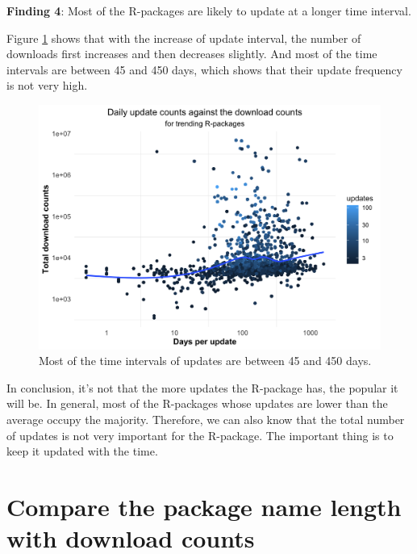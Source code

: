 \documentclass[
]{book}
\newenvironment{discovery}[1]{%
  \begin{tcolorbox}[colback=blue!30,colframe=blue!80!black]#1}{\end{tcolorbox}}
\begin{document}
\begin{discovery}
\textbf{Finding 4}: Most of the R-packages are likely to update at a
longer time interval.
\end{discovery}

Figure \ref{fig:updates-perday} shows that with the increase of update interval, the number of downloads first increases and then decreases slightly. And most of the time intervals are between 45 and 450 days, which shows that their update frequency is not very high.



\begin{figure}

{\centering \includegraphics{figures/updates-perday-1} 

}

\caption{Most of the time intervals of updates are between 45 and 450 days.}\label{fig:updates-perday}
\end{figure}

In conclusion, it's not that the more updates the R-package has, the popular it will be. In general, most of the R-packages whose updates are lower than the average occupy the majority. Therefore, we can also know that the total number of updates is not very important for the R-package. The important thing is to keep it updated with the time.

\hypertarget{compare-the-package-name-length-with-download-counts}{%
\section{Compare the package name length with download counts}\label{compare-the-package-name-length-with-download-counts}}
\end{document}
